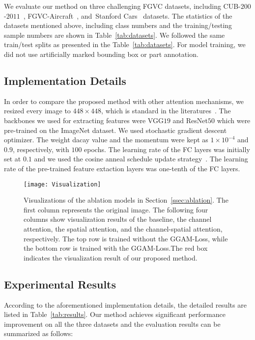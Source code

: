 \documentclass{article}
\begin{document}
We evaluate our method on three challenging FGVC datasets, including CUB-$200$-$2011$~\cite{birds}, FGVC-Aircraft~\cite{air}, and~Stanford Cars~\cite{cars} datasets. The statistics of the datasets mentioned above, including class numbers and the training/testing sample numbers are shown in Table~\ref{tab:datasets}. We followed the same train/test splits as presented in the Table~\ref{tab:datasets}. For model training, we did not use artificially marked bounding box or part annotation.
\vspace{-1mm}
\subsection{Implementation Details}
\vspace{-0.35em}
In order to compare the proposed method with other attention mechanisms, we resized every image to $448\times448$, which is standard in the literatures~\cite{DCL,ACNet}. The backbones we used for extracting features were VGG$19$ and ResNet$50$ which were pre-trained on the ImageNet dataset. We used stochastic gradient descent optimizer. The weight dacay value and the momentum were kept as $1\times10^{-4}$ and $0.9$, respectively, with $100$ epochs. The learning rate of the FC layers was initially set at $0.1$ and we used the cosine anneal schedule update strategy~\cite{cos}. The learning rate of the pre-trained feature extaction layers was one-tenth of the FC layers. 
\begin{figure*}[!t]
    \centering 
    \texttt{[image: Visualization]}  
    \vspace{-6mm}
    \caption{Visualizations of the ablation models in Section~\ref{ssec:ablation}. The first column represents  the original image. The following four columns show visualization results of the baseline, the channel attention, the spatial attention, and the channel-spatial attention, respectively. The top row is trained without the GGAM-Loss, while the bottom row is trained with the GGAM-Loss.The red box indicates the visualization result of our proposed method.}\label{fig:visual}
\end{figure*}
\vspace{-1mm} 
\subsection{Experimental Results}

According to the aforementioned implementation details, the detailed results are listed in Table~\ref{tab:results}. Our method achieves significant performance improvement on all the three datasets and the evaluation results can be summarized as follows:
\end{document}
